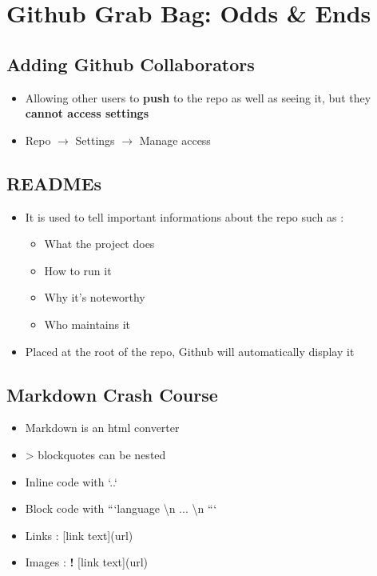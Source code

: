 \documentclass{report}
\begin{document}
\chapter{Github Grab Bag: Odds \& Ends}

\section{Adding Github Collaborators}

\begin{itemize}
	\item Allowing other users to \textbf{push} to the repo as well as seeing it, but they \textbf{cannot access settings} 
	\item Repo $\rightarrow$ Settings $\rightarrow$ Manage access
\end{itemize}

\section{READMEs}

\begin{itemize}
	\item It is used to tell important informations about the repo such as :
		\begin{itemize}
			\item What the project does 
			\item How to run it 
			\item Why it's noteworthy 
			\item Who maintains it
		\end{itemize}
	\item Placed at the root of the repo, Github will automatically display it
\end{itemize}

\section{Markdown Crash Course}

\begin{itemize}
	\item Markdown is an html converter 
	\item > blockquotes can be nested 
	\item Inline code with `..` 
	\item Block code with ```language \textbackslash n ... \textbackslash n ``` 
	\item Links : [link text](url)
	\item Images : \textbf{!} [link text](url)
\end{itemize}
\end{document}
